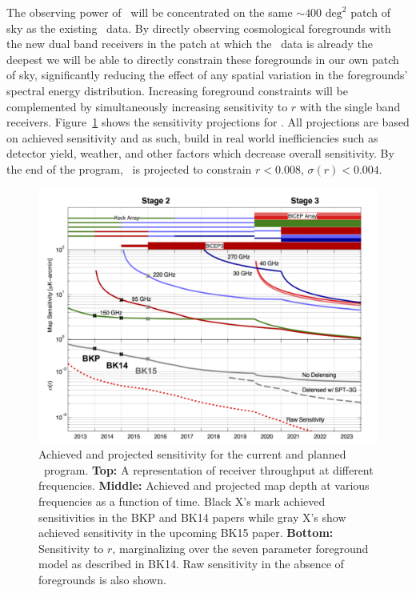 \documentclass[]{spie}  %
\begin{document}
The observing power of \biceparray\ will be concentrated on the same $\sim400
\text{ deg}^2$ patch of sky as the existing \bk\ data. By directly
observing cosmological foregrounds with the new dual band receivers in the
patch at which the \bk\ data is already the deepest we will be able to
directly constrain these foregrounds in our own patch of sky, significantly
reducing the effect of any spatial variation in the foregrounds' spectral
energy distribution. Increasing foreground constraints will be complemented by
simultaneously increasing sensitivity to $r$ with the single band receivers. Figure~\ref{fig:projections} shows the sensitivity projections for \biceparray. All projections are based on achieved sensitivity and as such, build in real world inefficiencies such as detector yield, weather, and other factors which decrease overall sensitivity. By the end of the program, \biceparray\ is projected to constrain $r<0.008$, $\sigma (r)<0.004$.


\begin{figure}[hb]
\center
\includegraphics[scale=0.4]{projections.pdf}
\caption{Achieved and projected sensitivity for the current and planned \bk\ program. \textbf{Top:} A representation of receiver throughput at different frequencies. \textbf{Middle:} Achieved and projected map depth at various frequencies as a function of time. Black X's mark achieved sensitivities in the BKP\cite{bkp} and BK14\cite{bk14} papers while gray X's show achieved sensitivity in the upcoming BK15 paper. \textbf{Bottom:} Sensitivity to $r$, marginalizing over the seven parameter foreground model as described in BK14. Raw sensitivity in the absence of foregrounds is also shown.}
\label{fig:projections}
\end{figure}









\end{document}
